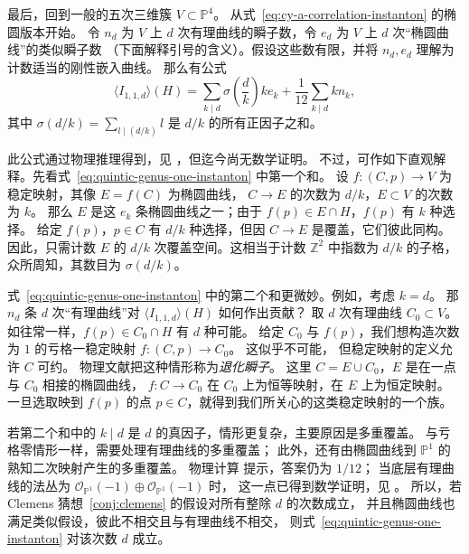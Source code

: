 \begin{example}\label{ex:quintic-genus-one}
最后，回到一般的五次三维簇 $V\subset\mathbb P^4$。
从式~\eqref{eq:cy-a-correlation-instanton} 的椭圆版本开始。
令 $n_d$ 为 $V$ 上 $d$ 次有理曲线的瞬子数，令 $e_d$ 为 $V$ 上 $d$ 次“椭圆曲线”的类似瞬子数
（下面解释引号的含义）。假设这些数有限，并将 $n_d,e_d$ 理解为计数适当的刚性嵌入曲线。
那么有公式
\begin{equation}\label{eq:quintic-genus-one-instanton}
\langle I_{1,1,d}\rangle(H)=\sum_{k\mid d}\sigma\!\left(\frac d k\right)ke_k
+\frac1{12}\sum_{k\mid d}kn_k,
\end{equation}
其中 $\sigma(d/k)=\sum_{l\mid(d/k)}l$ 是 $d/k$ 的所有正因子之和。

此公式通过物理推理得到，见 ，但迄今尚无数学证明。
不过，可作如下直观解释。先看式~\eqref{eq:quintic-genus-one-instanton} 中第一个和。
设 $f:(C,p)\to V$ 为稳定映射，其像 $E=f(C)$ 为椭圆曲线，
$C\to E$ 的次数为 $d/k$，$E\subset V$ 的次数为 $k$。
那么 $E$ 是这 $e_k$ 条椭圆曲线之一；由于 $f(p)\in E\cap H$，$f(p)$ 有 $k$ 种选择。
给定 $f(p)$，$p\in C$ 有 $d/k$ 种选择，但因 $C\to E$ 是覆盖，它们彼此同构。
因此，只需计数 $E$ 的 $d/k$ 次覆盖空间。这相当于计数 $\mathbb Z^2$ 中指数为 $d/k$ 的子格，
众所周知，其数目为 $\sigma(d/k)$。

式~\eqref{eq:quintic-genus-one-instanton} 中的第二个和更微妙。例如，考虑 $k=d$。
那 $n_d$ 条 $d$ 次“有理曲线”对 $\langle I_{1,1,d}\rangle(H)$ 如何作出贡献？
取 $d$ 次有理曲线 $C_0\subset V$。如往常一样，$f(p)\in C_0\cap H$ 有 $d$ 种可能。
给定 $C_0$ 与 $f(p)$，我们想构造次数为 $1$ 的亏格一稳定映射 $f:(C,p)\to C_0$。
这似乎不可能，
但稳定映射的定义允许 $C$ 可约。
物理文献把这种情形称为\emph{退化瞬子}。
这里 $C=E\cup C_0$，$E$ 是在一点与 $C_0$ 相接的椭圆曲线，
$f:C\to C_0$ 在 $C_0$ 上为恒等映射，在 $E$ 上为恒定映射。
一旦选取映到 $f(p)$ 的点 $p\in C$，就得到我们所关心的这类稳定映射的一个族。

若第二个和中的 $k\mid d$ 是 $d$ 的真因子，情形更复杂，主要原因是多重覆盖。
与亏格零情形一样，需要处理有理曲线的多重覆盖；
此外，还有由椭圆曲线到 $\mathbb P^1$ 的熟知二次映射产生的多重覆盖。
物理计算  提示，答案仍为 $1/12$；
当底层有理曲线的法丛为 $\mathcal O_{\mathbb P^1}(-1)\oplus\mathcal O_{\mathbb P^1}(-1)$ 时，
这一点已得到数学证明，见 。
所以，若 Clemens 猜想~\ref{conj:clemens} 的假设对所有整除 $d$ 的次数成立，
并且椭圆曲线也满足类似假设，彼此不相交且与有理曲线不相交，
则式~\eqref{eq:quintic-genus-one-instanton} 对该次数 $d$ 成立。


\end{example}
